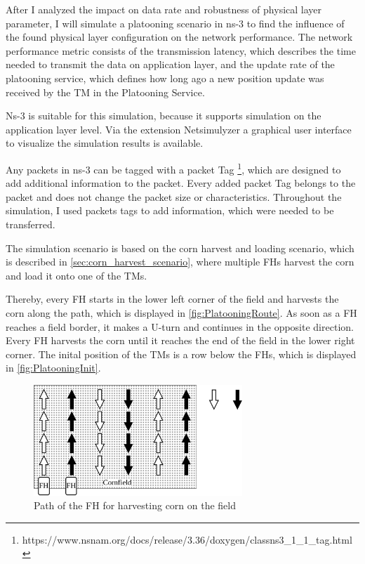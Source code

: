 After I analyzed the impact on data rate and robustness of physical layer parameter, I will simulate a platooning
scenario in ns-3 to find the influence of the found physical layer configuration on the network performance.
The network performance metric consists of the transmission latency, which describes the time needed to transmit the data
on application layer, and the update rate of the platooning service, which defines how long ago a new position update
was received by the \ac{TM} in the Platooning Service.

Ns-3 is suitable for this simulation, because it supports simulation on the application layer level. Via the extension Netsimulyzer
a graphical user interface to visualize the simulation results is available.

Any packets in ns-3 can be tagged with a packet Tag \footnote{https://www.nsnam.org/docs/release/3.36/doxygen/classns3_1_1_tag.html},
which are designed to add additional information to the packet. Every added packet Tag belongs to the packet and does not change
the packet size or characteristics. Throughout the simulation, I used packets tags to add information, which were needed to be
transferred.

The simulation scenario is based on the corn harvest and loading scenario, which is described in \autoref{sec:corn_harvest_scenario}, where
multiple \ac{FH}s harvest the corn and load it onto one of the \ac{TM}s.

Thereby, every \ac{FH} starts in the lower left corner of the field and harvests the corn along the path,
which is displayed in \autoref{fig:PlatooningRoute}. As soon as a \ac{FH} reaches a field border, it makes a U-turn and continues
in the opposite direction.
Every \ac{FH} harvests the corn until it reaches the end of the field in the lower right corner.
The inital position of the \ac{TMs} is a row below the \ac{FH}s, which is displayed in \autoref{fig:PlatooningInit}.
\begin{figure}[H]%
	\centering
	\includegraphics[width=0.7\textwidth]{figures/drawings-Route}
	\caption{Path of the \acf{FH} for harvesting corn on the field}
	\label{fig:PlatooningRoute}%
\end{figure}


